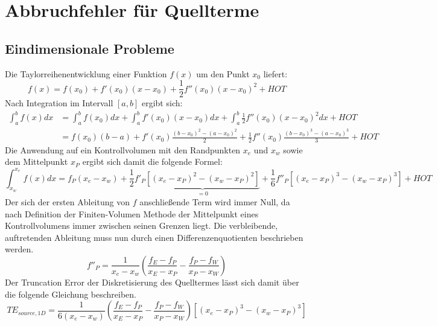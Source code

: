 \newcommand{\pder}[2][]{\frac{\partial#1}{\partial#2}}
\newcommand{\pderf}[1]{\frac{\partial f}{\partial#1}}
\newcommand{\pderfs}[1]{\frac{\partial^2 f}{\partial#1}}


\section{Abbruchfehler für Quellterme}
\label{sec:Quellterm}

\subsection{Eindimensionale Probleme}

Die Taylorreihenentwicklung einer Funktion $f(x)$ um den Punkt $x_0$
liefert:
\begin{equation*}
  f(x) = f(x_0) + f'(x_0)(x-x_0) + \frac{1}{2} f''(x_0)(x-x_0)^2 + HOT
\end{equation*}
Nach Integration im Intervall $[a, b]$ ergibt sich:
\begin{align*}
  \int_a^b f(x) dx &= \int_a^b f(x_0) dx + \int_a^b f'(x_0)(x-x_0) dx
+ \int_a^b \frac{1}{2} f''(x_0)(x-x_0)^2 dx + HOT\\
&= f(x_0) (b-a) + f'(x_0) \frac{(b-x_0)^2-(a-x_0)^2}{2}
+ \frac{1}{2} f''(x_0) \frac{(b-x_0)^3-(a-x_0)^3}{3} +HOT
\end{align*}
Die Anwendung auf ein Kontrollvolumen mit den Randpunkten $x_e$ und
$x_w$ sowie dem Mittelpunkt $x_P$ ergibt sich damit die folgende Formel:
\begin{equation*}
  \int_{x_w}^{x_e} f(x)dx = f_P(x_e-x_w)
  + \frac{1}{2} f'_P \underbrace{\left[{(x_e-x_P)^2-(x_w-x_P)^2}\right]}_{=0}
+ \frac{1}{6} f''_P \left[{{(x_e-x_P)}^3-{(x_w-x_P)}^3}\right] + HOT
\end{equation*}
Der sich der ersten Ableitung von $f$ anschließende Term wird immer Null, da nach
Definition der Finiten-Volumen Methode der Mittelpunkt eines Kontrollvolumens immer
zwischen seinen Grenzen liegt.
Die verbleibende, auftretenden Ableitung muss nun durch einen Differenzenquotienten
beschrieben werden.
\begin{equation}
  \label{eq:diskretisierung_f''P}
  f''_P = \frac{1}{x_e-x_w}\left(\frac{f_E-f_P}{x_E-x_P}-\frac{f_P-f_W}{x_P-x_W}\right)
\end{equation}
Der Truncation Error der Diskretisierung des Quelltermes lässt sich damit über die
folgende Gleichung beschreiben.
\begin{equation}
  TE_{source,1D} =
\frac{1}{6(x_e-x_w)}\left(\frac{f_E-f_P}{x_E-x_P}-\frac{f_P-f_W}{x_P-x_W}\right)
  \left[{{(x_e-x_P)}^3-{(x_w-x_P)}^3}\right]
\end{equation}

